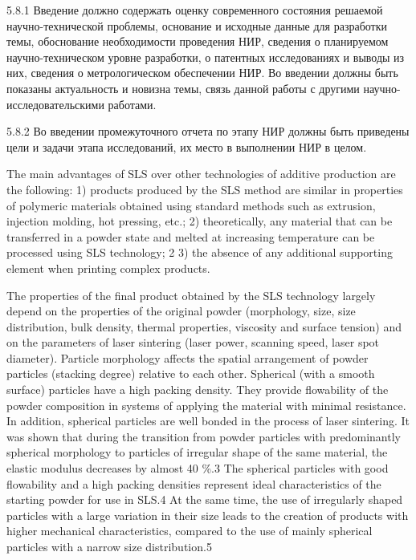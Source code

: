 	5.8.1 Введение должно содержать оценку современного состояния решаемой научно-технической проблемы, основание и исходные данные для разработки темы, обоснование необходимости проведения НИР, сведения о планируемом научно-техническом уровне разработки, о патентных исследованиях и выводы из них, сведения о метрологическом обеспечении НИР. Во введении должны быть показаны актуальность и новизна темы, связь данной работы с другими научно-исследовательскими работами.

5.8.2 Во введении промежуточного отчета по этапу НИР должны быть приведены цели и задачи этапа исследований, их место в выполнении НИР в целом.
	




The main advantages of SLS over other technologies of additive production are the following: 1) products produced by the SLS method are similar in properties of polymeric materials obtained using standard methods such as extrusion, injection molding, hot pressing, etc.; 2) theoretically, any material that can be transferred in a powder state and melted at increasing temperature can be processed using SLS technology; 2 3) the absence of any additional supporting element when printing complex products.

The properties of the final product obtained by the SLS technology largely depend on the properties of the original powder (morphology, size, size distribution, bulk density, thermal properties, viscosity and surface tension) and on the parameters of laser sintering (laser power, scanning speed, laser spot diameter). Particle morphology affects the spatial arrangement of powder particles (stacking degree) relative to each other. Spherical (with a smooth surface) particles have a high packing density. They provide flowability of the powder composition in systems of applying the material with minimal resistance. In addition, spherical particles are well bonded in the process of laser sintering. It was shown that during the transition from powder particles with predominantly spherical morphology to particles of irregular shape of the same material, the elastic modulus decreases by almost 40 \%.3 The spherical particles with good flowability and a high packing densities represent ideal characteristics of the starting powder for use in SLS.4 At the same time, the use of irregularly shaped particles with a large variation in their size leads to the creation of products with higher mechanical characteristics, compared to the use of mainly spherical particles with a narrow size distribution.5
	
